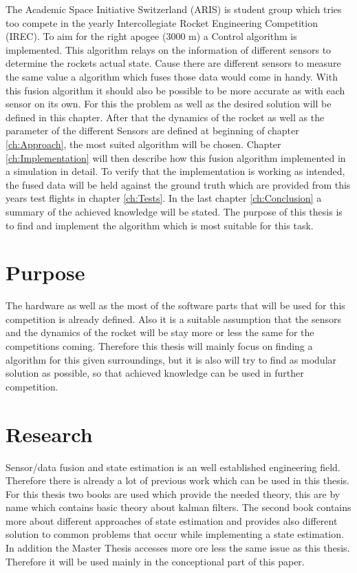  
 The Academic Space Initiative Switzerland (ARIS) is student group which tries too compete in the yearly Intercollegiate Rocket Engineering Competition (IREC).
 To aim for the right apogee (3000 m) a Control algorithm is implemented. This algorithm relays on the information of different sensors to determine the rockets actual state.
 Cause there are different sensors to measure the same value a algorithm which fuses those data would come in handy.
 With this fusion algorithm it should also be possible to be more accurate as with each sensor on its own.
 For this the problem as well as the desired solution will be defined in this chapter.
 After that the dynamics of the rocket as well as the parameter of the different Sensors are defined at beginning of chapter \ref{ch:Approach}, the most suited algorithm will be chosen.
 Chapter \ref{ch:Implementation} will then describe how this fusion algorithm implemented in a simulation in detail.
 To verify that the implementation is working as intended, the fused data will be held against the ground truth which are provided from this years test flights in chapter \ref{ch:Tests}.
 In the last chapter \ref{ch:Conclusion} a summary of the achieved knowledge will be stated.
 The purpose of this thesis is to find and implement the algorithm which is most suitable for this task.
 
 \section{Purpose}
 The hardware as well as the most of the software parts that will be used for this competition is already defined.
 Also it is a suitable assumption that the sensors and the dynamics of the rocket will be stay more or less the same for the competitions coming.
 Therefore this thesis will mainly focus on finding a algorithm for this given surroundings, but it is also will try to find as modular solution as possible, 
 so that achieved knowledge can be used in further competition.
  
 \section{Research}
 Sensor/data fusion and state estimation is an well established engineering field.
 Therefore there is already a lot of previous work which can be used in this thesis.
 For this thesis two books are used which provide the needed theory, this are by name
 \cite{DavidWSchultz2004} which contains basic theory about kalman filters. The second book
 \cite{SimonDan2006Ose:} contains more about different approaches of state estimation and
 provides also different solution to common problems that occur while implementing a state estimation.
 In addition the Master Thesis \cite{BryanTongMinh2012} accesses more ore less the same issue as this thesis.
 Therefore it will be used mainly in the conceptional part of this paper.
 
